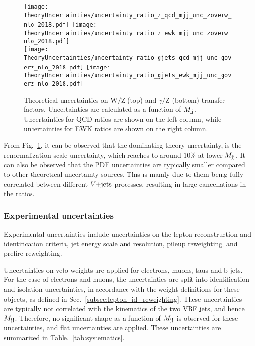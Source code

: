 \begin{figure}[htbp]
  \centering
    \texttt{[image: TheoryUncertainties/uncertainty\_ratio\_z\_qcd\_mjj\_unc\_zoverw\_nlo\_2018.pdf]}
    \texttt{[image: TheoryUncertainties/uncertainty\_ratio\_z\_ewk\_mjj\_unc\_zoverw\_nlo\_2018.pdf]} \\
    \texttt{[image: TheoryUncertainties/uncertainty\_ratio\_gjets\_qcd\_mjj\_unc\_goverz\_nlo\_2018.pdf]}
    \texttt{[image: TheoryUncertainties/uncertainty\_ratio\_gjets\_ewk\_mjj\_unc\_goverz\_nlo\_2018.pdf]}
  \caption{Theoretical uncertainties on W$/$Z (top) and $\gamma/$Z (bottom) transfer factors. Uncertainties are calculated as a
  function of $M_{\textrm{jj}}$. Uncertainties for QCD ratios are shown on the left column, while uncertainties for EWK ratios are shown on the right column.}
  \label{fig:theory_uncs}
\end{figure}

From Fig.~\ref{fig:theory_uncs}, it can be observed that the dominating theory uncertainty, is the renormalization
scale uncertainty, which reaches to around $10\%$ at lower $M_{\textrm{jj}}$. It can also be observed that the PDF uncertainties are typically smaller compared to
other theoretical uncertainty sources. This is mainly due to them being fully correlated between different $V\text{+jets}$ processes, resulting in large cancellations 
in the ratios. 

\clearpage

\subsubsection{Experimental uncertainties}

Experimental uncertainties include uncertainties on the lepton reconstruction and identification criteria, jet energy scale and resolution, 
pileup reweighting, and prefire reweighting.

Uncertainties on veto weights are applied for electrons, muons, taus and b jets. For the case of electrons and muons, the uncertainties are split
into identification and isolation uncertainties, in accordance with the weight definitions for these objects, as defined in Sec.~\ref{subsec:lepton_id_reweighting}.
These uncertainties are typically not correlated with the kinematics of the two VBF jets, and hence $M_{\textrm{jj}}$. Therefore, no significant shape as a function of $M_{\textrm{jj}}$ 
is observed for these uncertainties, and flat uncertainties are applied. These uncertainties are summarized in Table.~\ref{tab:systematics}.

